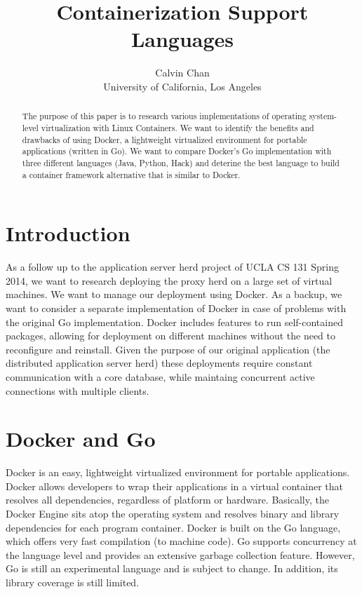 \documentclass[letterpaper,twocolumn,10pt]{article}
\begin{document}
\date{}

\title{\Large \bf Containerization Support Languages}

\author{
{\rm Calvin Chan} \\
University of California, Los Angeles
}

\maketitle

\begin{abstract}
The purpose of this paper is to research various implementations of operating system-level virtualization with Linux Containers. We want to identify the benefits and drawbacks of using Docker, a lightweight virtualized environment for portable applications (written in Go). We want to compare Docker's Go implementation with three different languages (Java, Python, Hack) and deterine the best language to build a container framework alternative that is similar to Docker.
\end{abstract}

\section{Introduction}
As a follow up to the application server herd project of UCLA CS 131 Spring 2014, we want to research deploying the proxy herd on a large set of virtual machines. We want to manage our deployment using Docker. As a backup, we want to consider a separate implementation of Docker in case of problems with the original Go implementation. Docker includes features to run self-contained packages, allowing for deployment on different machines without the need to reconfigure and reinstall. Given the purpose of our original application (the distributed application server herd) these deployments require constant communication with a core database, while maintaing concurrent active connections with multiple clients.

\section{Docker and Go}
Docker is an easy, lightweight virtualized environment for portable applications. Docker allows developers to wrap their applications in a virtual container that resolves all dependencies, regardless of platform or hardware. Basically, the Docker Engine sits atop the operating system and resolves binary and library dependencies for each program container. Docker is built on the Go language, which offers very fast compilation (to machine code). Go supports concurrency at the language level and provides an extensive garbage collection feature. However, Go is still an experimental language and is subject to change. In addition, its library coverage is still limited.
\end{document}
